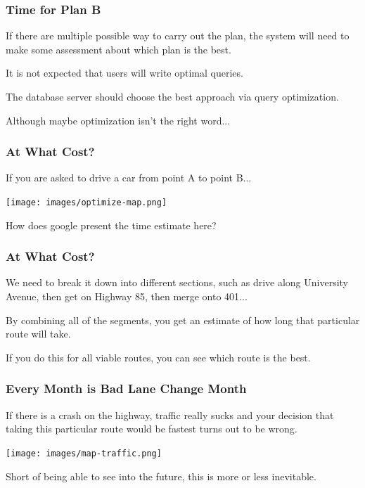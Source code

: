 \begin{frame}
\frametitle{Time for Plan B}

If there are multiple possible way to carry out the plan, the system will need to make some assessment about which plan is the best. 

It is not expected that users will write optimal queries.

The database server should choose the best approach via \alert{query optimization}. 

Although maybe optimization isn't the right word...

\end{frame}

\begin{frame}
\frametitle{At What Cost?}

If you are asked to drive a car from point A to point B...

\begin{center}
	\texttt{[image: images/optimize-map.png]}
\end{center}

How does google present the time estimate here?

\end{frame}

\begin{frame}
\frametitle{At What Cost?}

We need to break it down into different sections, such as drive along University Avenue, then get on Highway 85, then merge onto 401... 

By combining all of the segments, you get an estimate of how long that particular route will take. 

If you do this for all viable routes, you can see which route is the best. 

\end{frame}

\begin{frame}
\frametitle{Every Month is Bad Lane Change Month}

If there is a crash on the highway, traffic really sucks and your decision that taking this particular route would be fastest turns out to be wrong. 

\begin{center}
	\texttt{[image: images/map-traffic.png]}
\end{center}

Short of being able to see into the future, this is more or less inevitable.

\end{frame}

